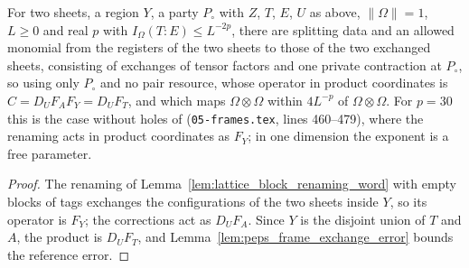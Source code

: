 \begin{lemma}
    \label{thm:lattice_sheet_exchange_bounded}
    \leanok
    For two sheets, a region $Y$, a party $P_\circ$ with $Z$, $T$, $E$, $U$ as
    above, $\lVert\Omega\rVert=1$, $L\ge0$ and real $p$ with
    $I_\Omega(T:E)\le L^{-2p}$, there
    are splitting data and an allowed monomial from the registers of the two
    sheets to those of the two exchanged sheets, consisting of exchanges of
    tensor factors and one private contraction at $P_\circ$, so using only
    $P_\circ$ and no pair resource, whose operator in product coordinates is
    $C=D_UF_AF_Y=D_UF_T$, and which maps $\Omega\otimes\Omega$ within
    $4L^{-p}$ of $\Omega\otimes\Omega$. For $p=30$ this is the case without
    holes of \cite[Lemma~6.6]{OpenAI2026PolynomialPEPS} (\texttt{05-frames.tex},
    lines 460--479), where the renaming acts in product coordinates as $F_Y$;
    in one dimension the exponent is a free parameter.
\end{lemma}

\begin{proof}\leanok
    The renaming of Lemma~\ref{lem:lattice_block_renaming_word} with empty
    blocks of tags exchanges the configurations of the two sheets inside $Y$,
    so its operator is $F_Y$; the corrections act as $D_UF_A$. Since $Y$ is
    the disjoint union of $T$ and $A$, the product is $D_UF_T$, and
    Lemma~\ref{lem:peps_frame_exchange_error} bounds the reference error.
\end{proof}

